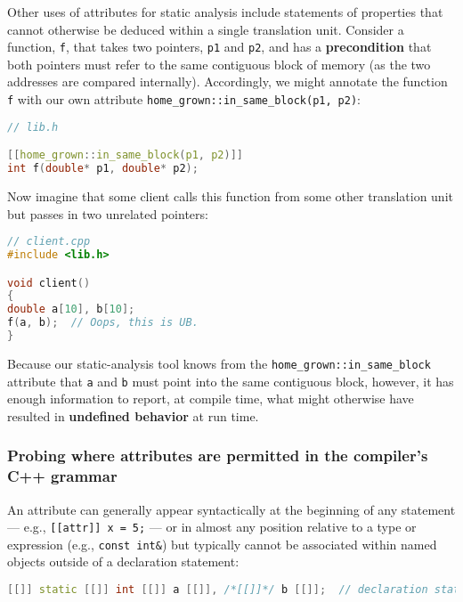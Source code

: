 Other uses of attributes for static analysis include statements of
properties that cannot otherwise be deduced within a single translation
unit. Consider a function, \texttt{f}, that takes two pointers,
\texttt{p1} and \texttt{p2}, and has a \textbf{precondition} that both
pointers must refer to the same contiguous block of memory (as the two
addresses are compared internally). Accordingly, we might annotate the
function \texttt{f} with our own attribute
\texttt{home\_grown::in\_same\_block(p1,}~\texttt{p2)}:

\begin{lstlisting}[language=C++]
// lib.h

[[home_grown::in_same_block(p1, p2)]]
int f(double* p1, double* p2);
\end{lstlisting}

\noindent Now imagine that some client calls this function from some other
translation unit but passes in two unrelated pointers:

\begin{lstlisting}[language=C++]
// client.cpp
#include <lib.h>

void client()
{
double a[10], b[10];
f(a, b);  // Oops, this is UB.
}
\end{lstlisting}

\noindent Because our static-analysis tool knows from the
\texttt{home\_grown::in\_same\_block} attribute that \texttt{a} and
\texttt{b} must point into the same contiguous block, however, it has
enough information to report, at compile time, what might otherwise have
resulted in \textbf{undefined behavior} at run time.

\subsubsection[Probing where attributes are permitted in the compiler’s C++ grammar]{Probing where attributes are permitted in the compiler’s C++ grammar}\label{probing-where-attributes-are-permitted-in-the-compiler’s-c++-grammar}

An attribute can generally appear syntactically at the beginning of any
statement --- e.g.,
\texttt{[[attr]]}~\texttt{x}~\texttt{=}~\texttt{5;} --- or in almost any
position relative to a type or expression (e.g.,
\texttt{const}~\texttt{int\&}) but typically cannot be associated
within named objects outside of a declaration statement:

\begin{lstlisting}[language=C++]
[[]] static [[]] int [[]] a [[]], /*[[]]*/ b [[]];  // declaration statement
\end{lstlisting}

